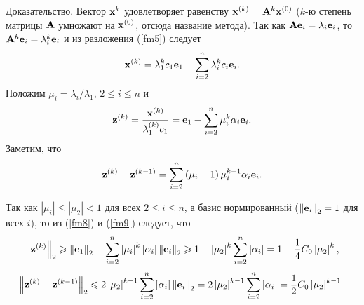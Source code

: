 \documentclass[12pt]{article}
\begin{document}
	Доказательство. Вектор $\bold{x}^{k}$ удовлетворяет равенству $\bold{x}^{\left(k\right)}=\bold{A}^{k}\bold{x}^{\left(0\right)}$ ($k$-ю степень матрицы $\bold{A}$ умножают на $\bold{x}^{\left(0\right)}$, отсюда название метода). Так как $\bold{Ae}_i=\lambda_i\bold{e}_i$, то $\bold{A}^k\bold{e}_i=\lambda_i^k\bold{e}_i$ и из разложения (\ref{fm5}) следует
	\begin{equation}
		\bold{x}^{\left(k\right)}=\lambda_1^k c_1 \bold{e}_1+\sum_{i=2}^{n}\lambda_i^kc_i\bold{e}_i.
	\end{equation}
	Положим $\mu_i=\lambda_i/\lambda_1$, $2\leqslant i \leqslant n$ и
	\begin{equation}
		\bold{z}^{\left(k\right)}=\frac{\bold{x}^{\left(k\right)}}{\lambda_1^{\left(k\right)}c_1}=\bold{e}_1+\sum_{i=2}^{n}\mu_i^{k}\alpha_i\bold{e}_i.\label{fm8}
	\end{equation}
	Заметим, что
	\begin{equation}
		\bold{z}^{\left(k\right)}-\bold{z}^{\left(k-1\right)}=\sum_{i=2}^{n}\left(\mu_i-1\right)\mu_i^{k-1}\alpha_i\bold{e}_i.\label{fm9}
	\end{equation}
	
	Так как $\left|\mu_i\right|\leqslant \left|\mu_2\right| < 1$ для всех $2\leqslant i \leqslant n$, а базис нормированный ($\left\|\bold{e}_i\right\|_2=1$ для всех $i$), то из (\ref{fm8}) и (\ref{fm9}) следует, что
	\begin{equation}
		\left\|\bold{z}^{\left(k\right)}\right\|_2\geqslant \left\|\bold{e}_1\right\|_2-\sum_{i=2}^{n}\left|\mu_i\right|^{k}\left|\alpha_i\right|\left\|\bold{e}_i\right\|_2\geqslant 1 -\left|\mu_2\right|^{k}\sum_{i=2}^{n}\left|\alpha_i\right|=1-\frac{1}{4}C_0\left|\mu_2\right|^k,\label{fm10}
	\end{equation}
	\begin{equation}
		\left\|\bold{z}^{\left(k\right)}-\bold{z}^{\left(k-1\right)}\right\|_2\leqslant 2\left|\mu_2\right|^{k-1}\sum_{i=2}^{n}\left|\alpha_i\right|\left\|\bold{e}_i\right\|_2=2\left|\mu_2\right|^{k-1}\sum_{i=2}^{n}\left|\alpha_i\right|=\frac{1}{2}C_0\left|\mu_2\right|^{k-1}.
	\end{equation}
	
\end{document}
